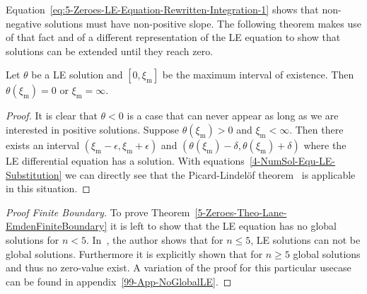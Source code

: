 Equation~\eqref{eq:5-Zeroes-LE-Equation-Rewritten-Integration-1} shows that non-negative solutions must have non-positive slope.
The following theorem makes use of that fact and of a different representation of the \ac{LE} equation to show that solutions can be extended until they reach zero.
\begin{lemma}
	Let $\theta$ be a \ac{LE} solution and $[0,\xi_\textrm{m}]$ be the maximum interval of existence.
	Then $\theta(\xi_\textrm{m})=0$ or $\xi_\textrm{m}=\infty$.
\end{lemma}
\begin{proof}
	It is clear that $\theta<0$ is a case that can never appear as long as we are interested in positive solutions.
	Suppose $\theta(\xi_\textrm{m})>0$ and $\xi_\textrm{m}<\infty$.
	Then there exists an interval $(\xi_\textrm{m}-\epsilon,\xi_\textrm{m}+\epsilon)$ and $(\theta(\xi_\textrm{m})-\delta,\theta(\xi_\textrm{m})+\delta)$ where the \ac{LE} differential equation has a solution.
	With equations~\ref{4-NumSol-Equ-LE-Substitution} we can directly see that the Picard-Lindelöf theorem~\cite{lindelofApplicationMethodeApproximations1894} is applicable in this situation.
\end{proof}
\begin{proof}[Proof  Finite Boundary]
	To prove Theorem~\ref{5-Zeroes-Theo-Lane-EmdenFiniteBoundary} it is left to show that the \ac{LE} equation has no global solutions for $n<5$.
	In~\cite[p.~36]{quittnerSuperlinearParabolicProblems2007}, the author shows that for $n\leq5$, \ac{LE} solutions can not be global solutions.
	Furthermore it is explicitly shown that for $n\geq5$ global solutions and thus no zero-value exist.
	A variation of the proof for this particular usecase can be found in appendix~\ref{99-App-NoGlobalLE}.
\end{proof}
%
%
